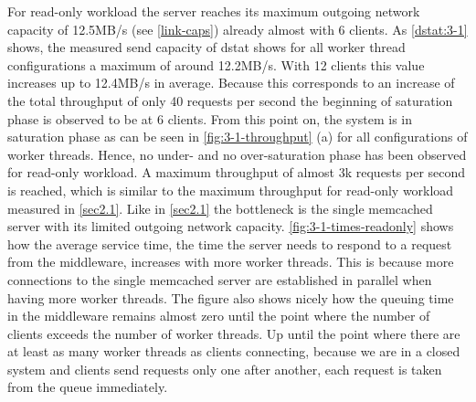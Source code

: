 \documentclass[11pt,a4paper]{article}
\begin{document}
For read-only workload the server reaches its maximum outgoing network capacity of 12.5MB/s (see \autoref{link-caps}) already almost with 6 clients. As \autoref{dstat:3-1} shows, the measured send capacity of dstat shows for all worker thread configurations a maximum of around 12.2MB/s. With 12 clients this value increases up to 12.4MB/s in average. Because this corresponds to an increase of the total throughput of only 40 requests per second the beginning of saturation phase is observed to be at 6 clients. From this point on, the system is in saturation phase as can be seen in \autoref{fig:3-1-throughput} (a) for all configurations of worker threads. Hence, no under- and no over-saturation phase has been observed for read-only workload.
A maximum throughput of almost 3k requests per second is reached, which is similar to the maximum throughput for read-only workload measured in \autoref{sec2.1}.
Like in \autoref{sec2.1} the bottleneck is the single memcached server with its limited outgoing network capacity.
\autoref{fig:3-1-times-readonly} shows how the average service time, the time the server needs to respond to a request from the middleware, increases with more worker threads. This is because more connections to the single memcached server are established in parallel when having more worker threads. The figure also shows nicely how the queuing time in the middleware remains almost zero until the point where the number of clients exceeds the number of worker threads. Up until the point where there are at least as many worker threads as clients connecting, because we are in a closed system and clients send requests only one after another, each request is taken from the queue immediately.
\end{document}
